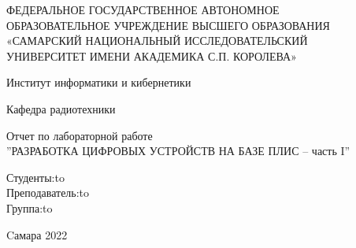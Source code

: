 \begin{titlepage}
\newpage
\doublespacing
\begin{center}
ФЕДЕРАЛЬНОЕ ГОСУДАРСТВЕННОЕ АВТОНОМНОЕ\\
ОБРАЗОВАТЕЛЬНОЕ УЧРЕЖДЕНИЕ ВЫСШЕГО ОБРАЗОВАНИЯ\\
«САМАРСКИЙ НАЦИОНАЛЬНЫЙ ИССЛЕДОВАТЕЛЬСКИЙ\\
УНИВЕРСИТЕТ ИМЕНИ АКАДЕМИКА С.П. КОРОЛЕВА»	
 \\
\end{center}

\vspace{5em}

\begin{center}
 Институт информатики и кибернетики \\ 
\end{center}

\begin{center}
Кафедра радиотехники \\ 
\end{center}


\vspace{3em}

\begin{center}
{Отчет по лабораторной работе\\''РАЗРАБОТКА ЦИФРОВЫХ УСТРОЙСТВ НА БАЗЕ ПЛИС -- часть I''}
\end{center}

\vspace{11em}




\newbox{\lbox}
\newlength{\maxl}
\setlength{\maxl}{\wd\lbox}
\hfill\parbox{10cm}{
\hspace*{6cm}\hspace*{-6cm}Студенты:\hfill\hbox to\\
\hspace*{4cm}\hspace*{-4cm}Преподаватель:\hfill\hbox to\\
\hspace*{4cm}\hspace*{-4cm}Группа:\hfill\hbox to\\
}


\vspace{\fill}

\begin{center}
Cамара 2022
\end{center}

\end{titlepage}